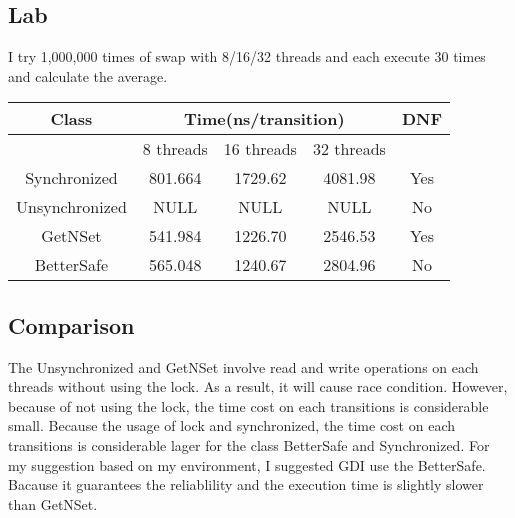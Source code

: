\documentclass[10pt, a4paper]{IEEEtran}
\begin{document}
    \subsection{Lab}
    I try 1,000,000 times of swap with 8/16/32 threads and each execute 30 times and calculate the average.
    \begin{tabular}{|c|c|c|c|c|}
        \hline
        Class&\multicolumn{3}{c|}{Time(ns/transition)}&DNF\\
        \hline
        &8 threads&16 threads&32 threads&\\
        \hline
        Synchronized&801.664 &1729.62 &4081.98&Yes \\
        \hline
        Unsynchronized&NULL &NULL &NULL&No\\
        \hline
        GetNSet&541.984 &1226.70 &2546.53&Yes\\
        \hline
        BetterSafe&565.048 &1240.67 &2804.96&No\\
        \hline
    \end{tabular}
    \subsection{Comparison}
    The Unsynchronized and GetNSet involve read and write operations on each threads without using the lock. As a result, it will cause race condition. However, because of not using the lock, the time cost on each transitions is considerable small.
    Because the usage of lock and synchronized, the time cost on each transitions is considerable lager for the class BetterSafe and Synchronized.
    For my suggestion based on my environment, I suggested GDI use the BetterSafe. Bacause it guarantees the reliablility and the execution time is slightly slower than GetNSet.


    

    

    
\end{document}
